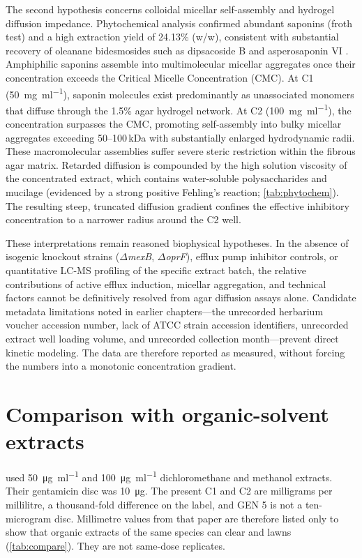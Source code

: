 The second hypothesis concerns colloidal micellar self-assembly and hydrogel diffusion impedance. Phytochemical analysis confirmed abundant saponins (froth test) and a high extraction yield of 24.13\% (w/w), consistent with substantial recovery of oleanane bidesmosides such as dipsacoside B and asperosaponin VI \citep{zhao2011phytochemicals,skala2023dipsacus}. Amphiphilic saponins assemble into multimolecular micellar aggregates once their concentration exceeds the Critical Micelle Concentration (CMC). At C1 (\SI{50}{\milli\gram\per\milli\litre}), saponin molecules exist predominantly as unassociated monomers that diffuse through the 1.5\% agar hydrogel network. At C2 (\SI{100}{\milli\gram\per\milli\litre}), the concentration surpasses the CMC, promoting self-assembly into bulky micellar aggregates exceeding 50--100\,kDa with substantially enlarged hydrodynamic radii. These macromolecular assemblies suffer severe steric restriction within the fibrous agar matrix. Retarded diffusion is compounded by the high solution viscosity of the concentrated extract, which contains water-soluble polysaccharides and mucilage (evidenced by a strong positive Fehling's reaction; \cref{tab:phytochem}). The resulting steep, truncated diffusion gradient confines the effective inhibitory concentration to a narrower radius around the C2 well.

These interpretations remain reasoned biophysical hypotheses. In the absence of isogenic knockout strains ($\Delta$\textit{mexB}, $\Delta$\textit{oprF}), efflux pump inhibitor controls, or quantitative LC-MS profiling of the specific extract batch, the relative contributions of active efflux induction, micellar aggregation, and technical factors cannot be definitively resolved from agar diffusion assays alone. Candidate metadata limitations noted in earlier chapters---the unrecorded herbarium voucher accession number, lack of ATCC strain accession identifiers, unrecorded extract well loading volume, and unrecorded collection month---prevent direct kinetic modeling. The data are therefore reported as measured, without forcing the numbers into a monotonic concentration gradient.

\section{Comparison with organic-solvent extracts}

\citet{drakhshaan2026identification} used \SI{50}{\micro\gram\per\milli\litre} and \SI{100}{\micro\gram\per\milli\litre} dichloromethane and methanol extracts. Their gentamicin disc was \SI{10}{\micro\gram}. The present C1 and C2 are milligrams per millilitre, a thousand-fold difference on the label, and GEN 5 is not a ten-microgram disc. Millimetre values from that paper are therefore listed only to show that organic extracts of the same species can clear  and  lawns (\cref{tab:compare}). They are not same-dose replicates.

